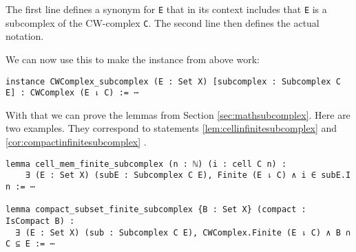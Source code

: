 The first line defines a synonym for \lstinline{E} that in its context includes that \lstinline{E} is a subcomplex of the CW-complex \lstinline{C}. 
The second line then defines the actual notation. 

We can now use this to make the instance from above work: 
\href{https://github.com/scholzhannah/CWComplexes/blob/7be4872a05b534011cc969eb5b80a4b7f0bf57e2/CWcomplexes/subcomplex.lean#L117-L174}{\faExternalLink}

\begin{lstlisting}
instance CWComplex_subcomplex (E : Set X) [subcomplex : Subcomplex C E] : CWComplex (E ⇂ C) := ⋯
\end{lstlisting}

With that we can prove the lemmas from Section \ref{sec:mathsubcomplex}. 
Here are two examples.
They correspond to statements \ref{lem:cellinfinitesubcomplex}
\href{https://github.com/scholzhannah/CWComplexes/blob/7be4872a05b534011cc969eb5b80a4b7f0bf57e2/CWcomplexes/subcomplex.lean#L336-L364}{\faExternalLink}
and \ref{cor:compactinfinitesubcomplex}
\href{https://github.com/scholzhannah/CWComplexes/blob/7be4872a05b534011cc969eb5b80a4b7f0bf57e2/CWcomplexes/subcomplex.lean#L386-L397}{\faExternalLink}.

\begin{lstlisting}
lemma cell_mem_finite_subcomplex (n : ℕ) (i : cell C n) :
    ∃ (E : Set X) (subE : Subcomplex C E), Finite (E ⇂ C) ∧ i ∈ subE.I n := ⋯

lemma compact_subset_finite_subcomplex {B : Set X} (compact : IsCompact B) :
  ∃ (E : Set X) (sub : Subcomplex C E), CWComplex.Finite (E ⇂ C) ∧ B ∩ C ⊆ E := ⋯
\end{lstlisting}